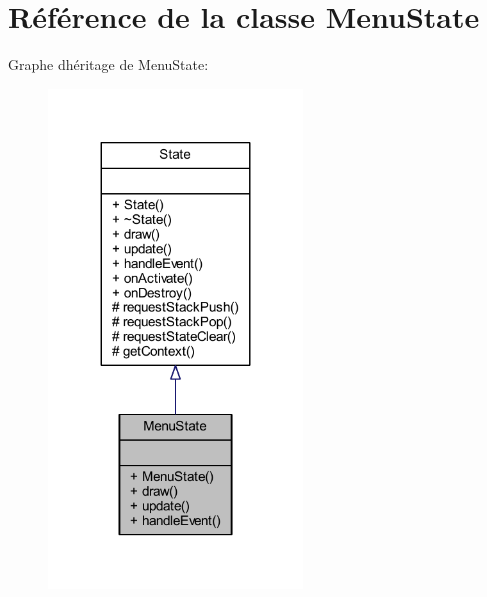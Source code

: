 \hypertarget{class_menu_state}{}\section{Référence de la classe Menu\+State}
\label{class_menu_state}


Graphe d\textquotesingle{}héritage de Menu\+State\+:\nopagebreak
\begin{figure}[H]
\begin{center}
\leavevmode
\includegraphics[width=191pt]{class_menu_state__inherit__graph}
\end{center}
\end{figure}


